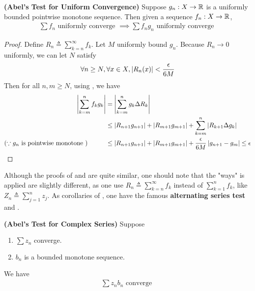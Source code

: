 \documentclass{report}
\begin{document}
\begin{theorem}
\label{Abel's Test for Uniform Convergence}
\textbf{(Abel's Test for Uniform Convergence)} Suppose $g_n:X\rightarrow \mathbb{R}$ is a uniformly bounded pointwise monotone sequence. Then given a sequence $f_n:X\rightarrow \mathbb{R}$, 
\begin{align*}
\sum f_n\text{ uniformly converge }\implies \sum f_ng_n\text{ uniformly converge }
\end{align*}
\end{theorem}
\begin{proof}
Define $R_n\triangleq \sum_{k=n}^{\infty}f_k$. Let $M$ uniformly bound $g_n$. Because $R_n\to 0$ uniformly, we can let $N$ satisfy 
 \begin{align*}
\forall n\geq N, \forall x\in X,\left|R_n(x)\right|<\frac{\epsilon}{6M} 
\end{align*}
Then for all $n,m\geq N$, using , we have
\begin{align*}
  \left|\sum_{k=m}^{n}f_kg_k\right|&=\left|\sum_{k=m}^n g_k\Delta R_k \right|\\
  &\leq \left|R_{n+1}g_{n+1}\right|+ \left|R_{m+1}g_{m+1}\right|+ \sum_{k=m}^n\left| R_{k+1}\Delta g_k\right| \\
  (\because g_n\text{ is pointwise monotone })\hspace{1cm}&\leq \left|R_{n+1}g_{n+1}\right|+ \left|R_{m+1}g_{m+1}\right|+ \frac{\epsilon }{6M} \left|g_{n+1}-g_m\right|\leq \epsilon 
\end{align*}
\end{proof}
\begin{mdframed}
Although the proofs of  and  are quite similar, one should note that the "ways"  is applied are slightly different, as one use $R_n\triangleq \sum_{k=n}^{\infty}f_k$ instead of $\sum_{k=1}^n f_k$, like $Z_n\triangleq \sum_{j=1}^n z_j$. As corollaries of  , one have the famous \textbf{alternating series test} and . 
\end{mdframed}
\begin{theorem}
\label{Abel's Test for Complex Series}
\textbf{(Abel's Test for Complex Series)} Suppose 
\begin{enumerate}[label=(\alph*)]
  \item $\sum z_n$ converge. 
  \item $b_n$ is a bounded monotone sequence.
\end{enumerate}
We have 
\begin{align*}
\sum z_nb_n\text{ converge }
\end{align*}
\end{theorem}
\end{document}
